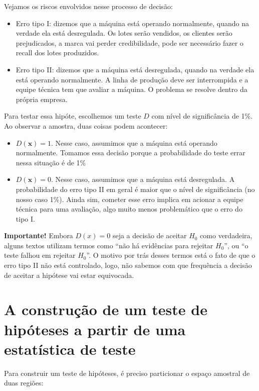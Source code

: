 \documentclass[
  letterpaper,
  DIV=11,
  numbers=noendperiod]{scrartcl}
\begin{document}
Vejamos os riscos envolvidos nesse processo de decisão:

\begin{itemize}
\item
  Erro tipo I: dizemos que a máquina está operando normalmente, quando
  na verdade ela está desregulada. Os lotes serão vendidos, os clientes
  serão prejudicados, a marca vai perder credibilidade, pode ser
  necessário fazer o recall dos lotes produzidos.
\item
  Erro tipo II: dizemos que a máquina está desregulada, quando na
  verdade ela está operando normalmente. A linha de produção deve ser
  interrompida e a equipe técnica tem que avaliar a máquina. O problema
  se resolve dentro da própria empresa.
\end{itemize}

Para testar essa hipóte, escolhemos um teste \(D\) com nível de
significância de 1\%. Ao observar a amostra, duas coisas podem
acontecer:

\begin{itemize}
\item
  \(D(\textbf{x})=1\). Nesse caso, assumimos que a máquina está operando
  normalmente. Tomamos essa decisão porque a probabilidade do teste
  errar nessa situação é de 1\%
\item
  \(D(\textbf{x})=0\). Nesse caso, assumimos que a máquina está
  desregulada. A probabilidade do erro tipo II em geral é maior que o
  nível de significância (no nosso caso 1\%). Ainda sim, cometer esse
  erro implica em acionar a equipe técnica para uma avaliação, algo
  muito menos problemático que o erro do tipo I.
\end{itemize}

\textbf{Importante!} Embora \(D(x)=0\) seja a decisão de aceitar \(H_0\)
como verdadeira, alguns textos utilizam termos como ``não há evidências
para rejeitar \(H_0\)'', ou ``o teste falhou em rejeitar \(H_0\)''. O
motivo por trás desses termos está o fato de que o erro tipo II não está
controlado, logo, não sabemos com que frequência a decisão de aceitar a
hipótese vai estar equivocada.

\section{A construção de um teste de hipóteses a partir de uma
estatística de
teste}\label{a-construuxe7uxe3o-de-um-teste-de-hipuxf3teses-a-partir-de-uma-estatuxedstica-de-teste}

Para construir um teste de hipóteses, é preciso particionar o espaço
amostral de duas regiões:
\end{document}
